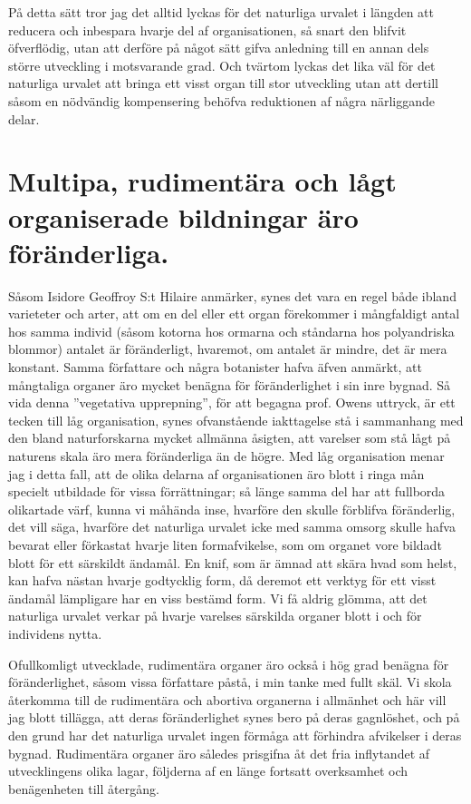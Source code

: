 På detta sätt tror jag det alltid lyckas för det naturliga urvalet i längden att reducera och inbespara hvarje del af organisationen, så snart den blifvit öfverflödig, utan att derföre på något sätt gifva anledning till en annan dels större utveckling i motsvarande grad. Och tvärtom lyckas det lika väl för det naturliga urvalet att bringa ett visst organ till stor utveckling utan att dertill såsom en nödvändig kompensering behöfva reduktionen af några närliggande delar.



\section[Rudimentära bildningar]{Multipa, rudimentära och lågt organiserade bildningar
äro föränderliga.}

Såsom Isidore Geoffroy S:t Hilaire anmärker, synes det vara en regel både ibland varieteter och arter, att om en del eller ett organ förekommer i mångfaldigt antal hos samma individ (såsom kotorna hos ormarna och ståndarna hos polyandriska blommor) antalet är föränderligt, hvaremot, om antalet är mindre, det är mera konstant. Samma författare och några botanister hafva äfven anmärkt, att mångtaliga organer äro mycket benägna för föränderlighet i sin inre bygnad. Så vida denna ”vegetativa upprepning”, för att begagna prof. Owens uttryck, är ett tecken till låg organisation, synes ofvanstående iakttagelse stå i sammanhang med den bland naturforskarna mycket allmänna åsigten, att varelser som stå lågt på naturens skala äro mera föränderliga än de högre. Med låg organisation menar jag i detta fall, att de olika delarna af organisationen äro blott i ringa mån specielt utbildade för vissa förrättningar; så länge samma del har att fullborda olikartade värf, kunna vi måhända inse, hvarföre den skulle förblifva föränderlig, det vill säga, hvarföre det naturliga urvalet icke med samma omsorg skulle hafva bevarat eller förkastat hvarje liten formafvikelse, som om organet vore bildadt blott för ett särskildt ändamål. En knif, som är ämnad att skära hvad som helst, kan hafva nästan hvarje godtycklig form, då deremot ett verktyg för ett visst ändamål lämpligare har en viss bestämd form. Vi få aldrig glömma, att det naturliga urvalet verkar på hvarje varelses särskilda organer blott i och för individens nytta.

Ofullkomligt utvecklade, rudimentära organer äro också i hög grad benägna för föränderlighet, såsom vissa författare påstå, i min tanke med fullt skäl. Vi skola återkomma till de rudimentära och abortiva organerna i allmänhet och här vill jag blott tillägga, att deras föränderlighet synes bero på deras gagnlöshet, och på den grund har det naturliga urvalet ingen förmåga att förhindra afvikelser i deras bygnad. Rudimentära organer äro således prisgifna åt det fria inflytandet af utvecklingens olika lagar, följderna af en länge fortsatt overksamhet och benägenheten till återgång.



